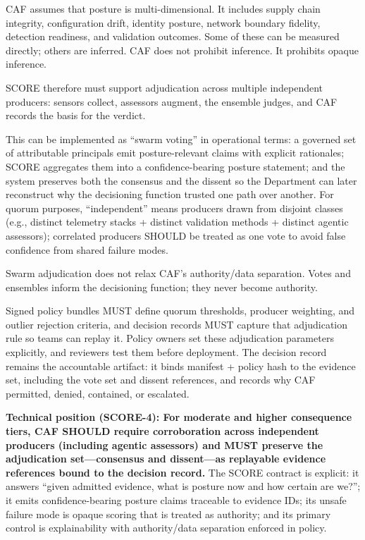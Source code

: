 \documentclass[11pt]{article}
\begin{document}
CAF assumes that posture is multi-dimensional. It includes supply chain
integrity, configuration drift, identity posture, network boundary
fidelity, detection readiness, and validation outcomes. Some of these
can be measured directly; others are inferred. CAF does not prohibit
inference. It prohibits opaque inference.

SCORE therefore must support adjudication across multiple independent producers: sensors collect, assessors augment, the ensemble judges, and CAF records the basis for the verdict.

This can be implemented as ``swarm voting'' in operational terms: a governed set of attributable principals emit posture-relevant claims with explicit rationales; SCORE aggregates them into a confidence-bearing posture statement; and the system preserves both the consensus and the dissent so the Department can later reconstruct why the decisioning function trusted one path over another. For quorum purposes, ``independent'' means producers drawn from disjoint classes (e.g., distinct telemetry stacks + distinct validation methods + distinct agentic assessors); correlated producers SHOULD be treated as one vote to avoid false confidence from shared failure modes.

Swarm adjudication does not relax CAF's authority/data separation. Votes and ensembles inform the decisioning function; they never become authority.

Signed policy bundles MUST define quorum thresholds, producer weighting, and outlier rejection criteria, and decision records MUST capture that adjudication rule so teams can replay it. Policy owners set these adjudication parameters explicitly, and reviewers test them before deployment. The decision record remains the accountable artifact: it binds manifest + policy hash to the evidence set, including the vote set and dissent references, and records why CAF permitted, denied, contained, or escalated.

\textbf{Technical position (SCORE-4): For moderate and higher consequence tiers, CAF SHOULD require corroboration across independent producers (including agentic assessors) and MUST preserve the adjudication set---consensus and dissent---as replayable evidence references bound to the decision record.}
The SCORE contract is explicit: it answers ``given admitted evidence, what is posture now and how certain are we?''; it emits confidence-bearing posture claims traceable to evidence IDs; its unsafe failure mode is opaque scoring that is treated as authority; and its primary control is explainability with authority/data separation enforced in policy.
\end{document}
